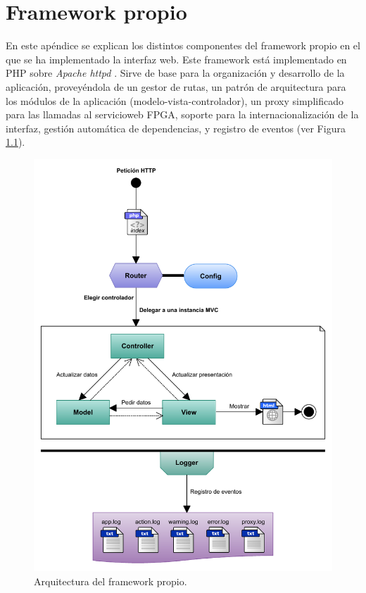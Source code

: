 \chapter{Framework propio\label{extra:framework_propio}}

En este apéndice se explican los distintos componentes del \gls{framework} propio en el que se ha implementado la interfaz web. Este \gls{framework} está implementado en \gls{PHP} sobre \textit{Apache httpd} \cite{httpd}. Sirve de base para la organización y desarrollo de la aplicación, proveyéndola de un gestor de rutas, un patrón de arquitectura para los módulos de la aplicación (modelo-vista-controlador), un \gls{proxy} simplificado para las llamadas al \gls{servicioweb} \gls{FPGA}, soporte para la internacionalización de la interfaz, gestión automática de dependencias, y registro de eventos (ver Figura \ref{fig:framework}).

\begin{figure}[!htp]
  \centering
  \includegraphics[width=\textwidth,clip=true]{graphics/framework}
  \caption{Arquitectura del \gls{framework} propio.}
  \label{fig:framework}
\end{figure}


